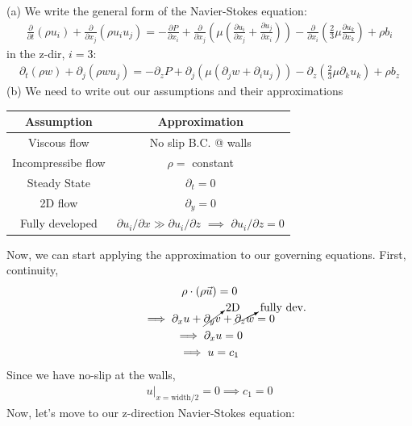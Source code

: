 (a) We write the general form of the Navier-Stokes equation:
\begin{align*}
    \frac{\partial}{\partial t} (\rho u_i) + \frac{\partial}{\partial x_j} (\rho u_i u_j) = -\frac{\partial P}{\partial x_i} + \frac{\partial}{\partial x_j} \left(\mu \left(\frac{\partial u_i}{\partial x_j} + \frac{\partial u_j}{\partial x_i}\right)\right) - \frac{\partial}{\partial x_i} \left(\frac{2}{3}\mu \frac{\partial u_k}{\partial x_k}\right) + \rho b_i
\end{align*}
in the z-dir, $i = 3$:
\begin{align*}
    \boxed{\partial_{t} (\rho w) + \partial_{j} (\rho w u_j) = -\partial_{z} P + \partial_{j} \left(\mu \left(\partial_{j} w + \partial_{i} u_j\right)\right) - \partial_{z} \left(\frac{2}{3}\mu \partial_{k} u_k\right) + \rho b_z}
\end{align*}
(b) We need to write out our assumptions and their approximations
\begin{table}[h]
    \centering
    \begin{tabular}{c|c}
        Assumption & Approximation \\
        \hline
        Viscous flow & No slip B.C. @ walls\\
        Incompressibe flow & $\rho = $ constant \\
        Steady State & $\partial_t = 0$ \\
        2D flow & $\partial_y = 0$ \\
        Fully developed & $\partial u_i/\partial x \gg \partial u_i/\partial z$ $\implies$ $\partial u_i / \partial z = 0$ \\
        \end{tabular}
\end{table}
Now, we can start applying the approximation to our governing equations. First, continuity,
\begin{gather*}
    \rho \cdot (\rho \vec{u}) = 0 \\
    \implies \partial_x u + \cancelto{\text{2D}}{\partial_y v} + \cancelto{\text{fully dev.}}{\partial_z w} = 0 \\
    \implies \partial_x u = 0 \\
    \implies u = c_1 
\end{gather*}
Since we have no-slip at the walls,
\begin{align*}
    u|_{x = \text{width}/2} = 0 \implies c_1 = 0
\end{align*}
Now, let's move to our z-direction Navier-Stokes equation:

